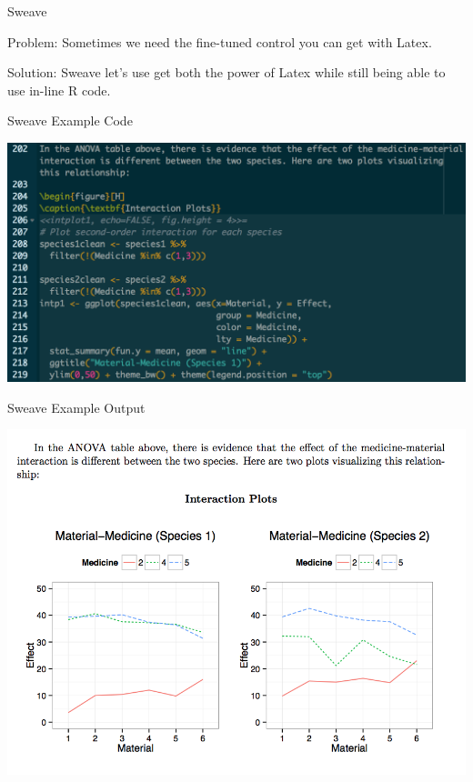 \begin{frame}{Sweave}

Problem: Sometimes we need the fine-tuned control you can get with
Latex.

Solution: Sweave let's use get both the power of Latex while still being
able to use in-line R code.

\end{frame}

\begin{frame}{Sweave Example Code}

\includegraphics{images/sweave1.png}

\end{frame}

\begin{frame}{Sweave Example Output}

\includegraphics{images/sweave2.png}

\end{frame}

